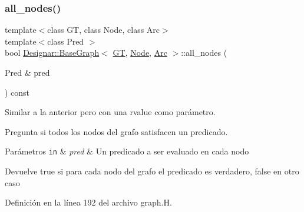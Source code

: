 \subsubsection{\texorpdfstring{all\+\_\+nodes()}{all\_nodes()}\hspace{0.1cm}{\footnotesize\ttfamily [1/2]}}
{\footnotesize\ttfamily template$<$class GT, class Node, class Arc$>$ \\
template$<$class Pred $>$ \\
bool \hyperlink{class_designar_1_1_base_graph}{Designar\+::\+Base\+Graph}$<$ \hyperlink{demo-buildgraph_8_c_a3001c40d2c31ca87ed96cd7d1334a55e}{GT}, \hyperlink{namespace_designar_a5af326c65aa2bd26b26c410f2030d09e}{Node}, \hyperlink{namespace_designar_a3f55fb5513d62ff47cbc8f72b8e95d6f}{Arc} $>$\+::all\+\_\+nodes (\begin{DoxyParamCaption}\item[{Pred \&}]{pred }\end{DoxyParamCaption}) const\hspace{0.3cm}{\ttfamily [inline]}}



Similar a la anterior pero con una rvalue como parámetro. 

Pregunta si todos los nodos del grafo satisfacen un predicado.


\begin{DoxyParams}[1]{Parámetros}
\mbox{\tt in}  & {\em pred} & Un predicado a ser evaluado en cada nodo \\
\hline
\end{DoxyParams}
\begin{DoxyReturn}{Devuelve}
{\ttfamily true} si para cada nodo del grafo el predicado es verdadero, {\ttfamily false} en otro caso 
\end{DoxyReturn}


Definición en la línea 192 del archivo graph.\+H.

\mbox{\label{class_designar_1_1_base_graph_a32419ec17712a60c1964bc91e78d135c}} 
